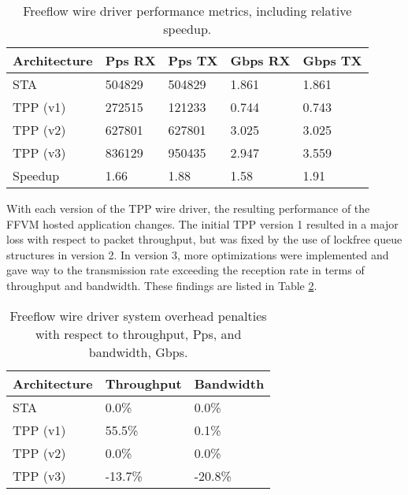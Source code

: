 \begin{table}[h]
  \centering
  \begin{tabular}{| C{2.5cm} | C{2.5cm} | C{2.5cm} | C{2.5cm} | C{2.5cm} |}
   \hline
   Architecture & Pps RX & Pps TX & Gbps RX & Gbps TX \\ [0.5ex]
   \hline
   STA & 504829 & 504829 & 1.861 & 1.861 \\
   \hline
   TPP (v1) & 272515 & 121233 & 0.744 & 0.743 \\
   \hline
   TPP (v2) & 627801 & 627801 & 3.025 & 3.025 \\
   \hline
   TPP (v3) & 836129 & 950435 & 2.947 & 3.559 \\ [1ex]
   \hline\hline
   Speedup & 1.66 & 1.88 & 1.58 & 1.91 \\ [1ex]
   \hline
\end{tabular}
\caption{Freeflow wire driver performance metrics, including relative speedup.}
\label{wire_performance}
\end{table}

With each version of the TPP wire driver, the resulting performance of the FFVM
hosted application changes. The initial TPP version 1 resulted in a major loss
with respect to packet throughput, but was fixed by the use of lockfree queue
structures in version 2. In version 3, more optimizations were implemented and
gave way to the transmission rate exceeding the reception rate in terms of
throughput and bandwidth. These findings are listed in Table
\ref{wire_penalties}.

\begin{table}[h]
  \centering
  \begin{tabular}{| C{2.5cm} | C{2.5cm} | C{2.5cm} |}
    \hline
    Architecture & Throughput & Bandwidth \\ [0.5ex]
    \hline
    STA &  0.0\% & 0.0\% \\
    \hline
    TPP (v1) & 55.5\% & 0.1\%\\
    \hline
    TPP (v2) & 0.0\% & 0.0\% \\
    \hline
    TPP (v3) & -13.7\%  & -20.8\%\\ [1ex]
    \hline
  \end{tabular}
  \caption{Freeflow wire driver system overhead penalties with respect to
  throughput, Pps, and bandwidth, Gbps.}
  \label{wire_penalties}
\end{table}
